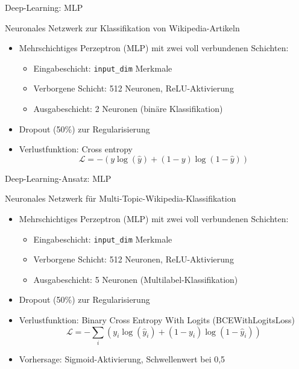 \documentclass[aspectratio=169]{beamer} %
\begin{document}
\begin{frame}{Deep-Learning: MLP}
    \begin{block}{Neuronales Netzwerk zur Klassifikation von Wikipedia-Artikeln}
        \begin{itemize}
            \item Mehrschichtiges Perzeptron (MLP) mit zwei voll verbundenen Schichten:
                  \begin{itemize}
                      \item Eingabeschicht: \texttt{input\_dim} Merkmale
                      \item Verborgene Schicht: 512 Neuronen, ReLU-Aktivierung
                      \item Ausgabeschicht: 2 Neuronen (binäre Klassifikation)
                  \end{itemize}
            \item Dropout (50\%) zur Regularisierung
            \item Verlustfunktion: Cross entropy
                  \begin{equation*}
                      \mathcal{L} = - \left( y \log(\hat{y}) + (1 - y) \log(1 - \hat{y}) \right)
                  \end{equation*}
        \end{itemize}
    \end{block}
\end{frame}

\begin{frame}{Deep-Learning-Ansatz: MLP}
    \begin{block}{Neuronales Netzwerk für Multi-Topic-Wikipedia-Klassifikation}
        \begin{itemize}
            \item Mehrschichtiges Perzeptron (MLP) mit zwei voll verbundenen Schichten:
                  \begin{itemize}
                      \item Eingabeschicht: \texttt{input\_dim} Merkmale
                      \item Verborgene Schicht: 512 Neuronen, ReLU-Aktivierung
                      \item Ausgabeschicht: 5 Neuronen (Multilabel-Klassifikation)
                  \end{itemize}
            \item Dropout (50\%) zur Regularisierung
            \item Verlustfunktion: Binary Cross Entropy With Logits (BCEWithLogitsLoss)
                  \begin{equation*}
                      \mathcal{L} = - \sum_{i} \left( y_i \log(\hat{y}_i) + (1 - y_i) \log(1 - \hat{y}_i) \right)
                  \end{equation*}
            \item Vorhersage: Sigmoid-Aktivierung, Schwellenwert bei 0,5
        \end{itemize}
    \end{block}
\end{frame}
\end{document}

